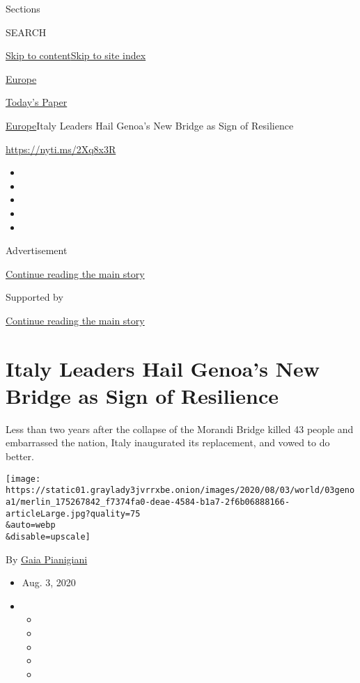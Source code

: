 Sections

SEARCH

\protect\hyperlink{site-content}{Skip to
content}\protect\hyperlink{site-index}{Skip to site index}

\href{https://www.nytimes3xbfgragh.onion/section/world/europe}{Europe}

\href{https://myaccount.nytimes3xbfgragh.onion/auth/login?response_type=cookie\&client_id=vi}{}

\href{https://www.nytimes3xbfgragh.onion/section/todayspaper}{Today's
Paper}

\href{/section/world/europe}{Europe}\textbar{}Italy Leaders Hail Genoa's
New Bridge as Sign of Resilience

\url{https://nyti.ms/2Xq8x3R}

\begin{itemize}
\item
\item
\item
\item
\item
\end{itemize}

Advertisement

\protect\hyperlink{after-top}{Continue reading the main story}

Supported by

\protect\hyperlink{after-sponsor}{Continue reading the main story}

\hypertarget{italy-leaders-hail-genoas-new-bridge-as-sign-of-resilience}{%
\section{Italy Leaders Hail Genoa's New Bridge as Sign of
Resilience}\label{italy-leaders-hail-genoas-new-bridge-as-sign-of-resilience}}

Less than two years after the collapse of the Morandi Bridge killed 43
people and embarrassed the nation, Italy inaugurated its replacement,
and vowed to do better.

\texttt{[image: https://static01.graylady3jvrrxbe.onion/images/2020/08/03/world/03genoa1/merlin\_175267842\_f7374fa0-deae-4584-b1a7-2f6b06888166-articleLarge.jpg?quality=75\\\&auto=webp\\\&disable=upscale]}

By \href{https://www.nytimes3xbfgragh.onion/by/gaia-pianigiani}{Gaia
Pianigiani}

\begin{itemize}
\item
  Aug. 3, 2020
\item
  \begin{itemize}
  \item
  \item
  \item
  \item
  \item
  \end{itemize}
\end{itemize}

